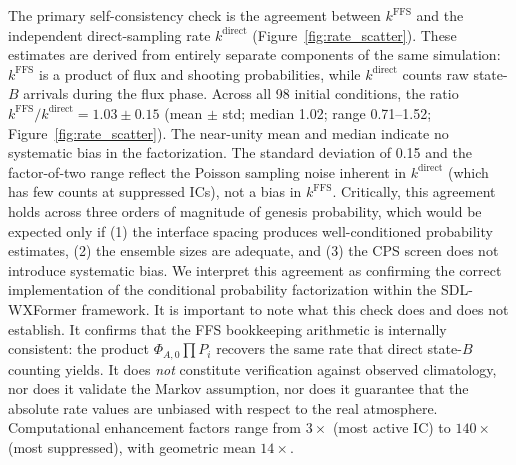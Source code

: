 \documentclass[11pt]{article}
\begin{document}
The primary self-consistency check is the agreement between $k^{\text{FFS}}$ and the
independent direct-sampling rate $k^{\text{direct}}$ (Figure~\ref{fig:rate_scatter}).
These estimates are derived from entirely separate components of the same simulation:
$k^{\text{FFS}}$ is a product of flux and shooting probabilities, while $k^{\text{direct}}$
counts raw state-$B$ arrivals during the flux phase.
Across all 98 initial conditions, the ratio $k^{\text{FFS}}/k^{\text{direct}} = 1.03 \pm 0.15$
(mean $\pm$ std; median 1.02; range 0.71--1.52; Figure~\ref{fig:rate_scatter}).
The near-unity mean and median indicate no systematic bias in the factorization.
The standard deviation of 0.15 and the factor-of-two range reflect the Poisson
sampling noise inherent in $k^{\text{direct}}$ (which has few counts at suppressed ICs),
not a bias in $k^{\text{FFS}}$.
Critically, this agreement holds across three orders of magnitude of genesis probability,
which would be expected only if (1) the interface spacing produces well-conditioned
probability estimates, (2) the ensemble sizes are adequate, and (3) the CPS screen
does not introduce systematic bias.
We interpret this agreement as confirming the correct implementation of the conditional
probability factorization within the SDL-WXFormer framework.
It is important to note what this check does and does not establish.
It confirms that the FFS bookkeeping arithmetic is internally consistent: the product
$\Phi_{A,0}\prod P_i$ recovers the same rate that direct state-$B$ counting yields.
It does \emph{not} constitute verification against observed climatology, nor does it
validate the Markov assumption, nor does it guarantee that the absolute
rate values are unbiased with respect to the real atmosphere.
Computational enhancement factors range from $3\times$ (most active IC) to $140\times$
(most suppressed), with geometric mean $14\times$.
\end{document}
